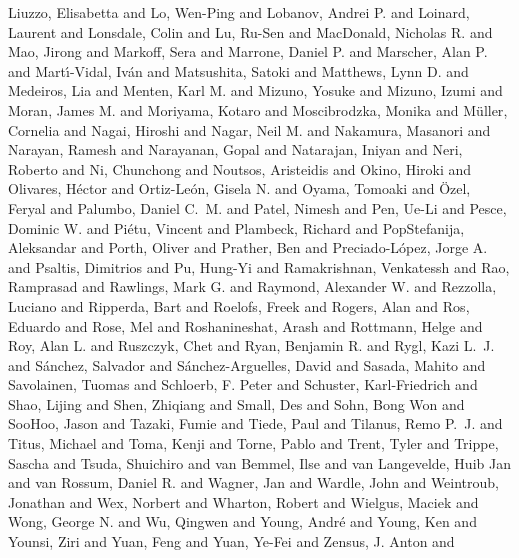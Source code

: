 {{{         {Liuzzo}, Elisabetta and {Lo}, Wen-Ping and {Lobanov}, Andrei P. and
         {Loinard}, Laurent and {Lonsdale}, Colin and {Lu}, Ru-Sen and
         {MacDonald}, Nicholas R. and {Mao}, Jirong and {Markoff}, Sera and
         {Marrone}, Daniel P. and {Marscher}, Alan P. and
         {Mart{\'\i}-Vidal}, Iv{\'a}n and {Matsushita}, Satoki and
         {Matthews}, Lynn D. and {Medeiros}, Lia and {Menten}, Karl M. and
         {Mizuno}, Yosuke and {Mizuno}, Izumi and {Moran}, James M. and
         {Moriyama}, Kotaro and {Moscibrodzka}, Monika and
         {M{\"u}ller}, Cornelia and {Nagai}, Hiroshi and {Nagar}, Neil M. and
         {Nakamura}, Masanori and {Narayan}, Ramesh and {Narayanan}, Gopal and
         {Natarajan}, Iniyan and {Neri}, Roberto and {Ni}, Chunchong and
         {Noutsos}, Aristeidis and {Okino}, Hiroki and {Olivares}, H{\'e}ctor and
         {Ortiz-Le{\'o}n}, Gisela N. and {Oyama}, Tomoaki and
         {{\"O}zel}, Feryal and {Palumbo}, Daniel C.~M. and {Patel}, Nimesh and
         {Pen}, Ue-Li and {Pesce}, Dominic W. and {Pi{\'e}tu}, Vincent and
         {Plambeck}, Richard and {PopStefanija}, Aleksandar and {Porth}, Oliver and
         {Prather}, Ben and {Preciado-L{\'o}pez}, Jorge A. and
         {Psaltis}, Dimitrios and {Pu}, Hung-Yi and {Ramakrishnan}, Venkatessh and
         {Rao}, Ramprasad and {Rawlings}, Mark G. and {Raymond}, Alexander W. and
         {Rezzolla}, Luciano and {Ripperda}, Bart and {Roelofs}, Freek and
         {Rogers}, Alan and {Ros}, Eduardo and {Rose}, Mel and
         {Roshanineshat}, Arash and {Rottmann}, Helge and {Roy}, Alan L. and
         {Ruszczyk}, Chet and {Ryan}, Benjamin R. and {Rygl}, Kazi L.~J. and
         {S{\'a}nchez}, Salvador and {S{\'a}nchez-Arguelles}, David and
         {Sasada}, Mahito and {Savolainen}, Tuomas and {Schloerb}, F. Peter and
         {Schuster}, Karl-Friedrich and {Shao}, Lijing and {Shen}, Zhiqiang and
         {Small}, Des and {Sohn}, Bong Won and {SooHoo}, Jason and
         {Tazaki}, Fumie and {Tiede}, Paul and {Tilanus}, Remo P.~J. and
         {Titus}, Michael and {Toma}, Kenji and {Torne}, Pablo and
         {Trent}, Tyler and {Trippe}, Sascha and {Tsuda}, Shuichiro and
         {van Bemmel}, Ilse and {van Langevelde}, Huib Jan and
         {van Rossum}, Daniel R. and {Wagner}, Jan and {Wardle}, John and
         {Weintroub}, Jonathan and {Wex}, Norbert and {Wharton}, Robert and
         {Wielgus}, Maciek and {Wong}, George N. and {Wu}, Qingwen and
         {Young}, Andr{\'e} and {Young}, Ken and {Younsi}, Ziri and
         {Yuan}, Feng and {Yuan}, Ye-Fei and {Zensus}, J. Anton and
}}}
